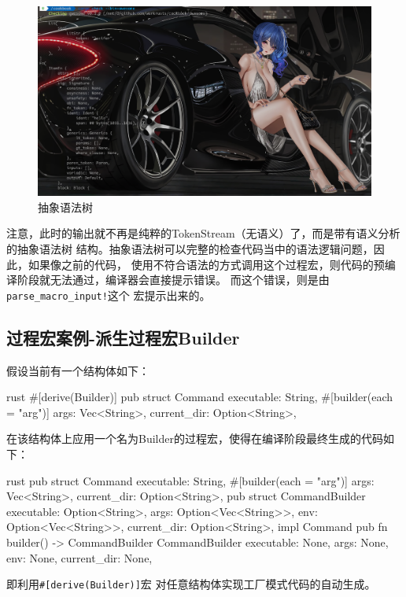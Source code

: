 \begin{figure}[H]
  \centering
  \includegraphics[width=\linewidth]{rust_ast.png}
  \caption{抽象语法树}
  \label{fig:rust_ast}
\end{figure}
注意，此时的输出就不再是纯粹的TokenStream（无语义）了，而是带有语义分析的抽象语法树
结构。抽象语法树可以完整的检查代码当中的语法逻辑问题，因此，如果像之前的代码，
使用不符合语法的方式调用这个过程宏，则代码的预编译阶段就无法通过，编译器会直接提示错误。
而这个错误，则是由\texttt{parse_macro_input!}这个
宏提示出来的。

\subsection{过程宏案例-派生过程宏Builder}
假设当前有一个结构体如下：
\begin{code-block}{rust}
#[derive(Builder)]
pub struct Command {
    executable: String,
    #[builder(each = "arg")]
    args: Vec<String>,
    current_dir: Option<String>,
}
\end{code-block}
在该结构体上应用一个名为Builder的过程宏，使得在编译阶段最终生成的代码如下：
\begin{code-block}{rust}
pub struct Command {
    executable: String,
    #[builder(each = "arg")]
    args: Vec<String>,
    current_dir: Option<String>,
}
pub struct CommandBuilder {
    executable: Option<String>,
    args: Option<Vec<String>>,
    env: Option<Vec<String>>,
    current_dir: Option<String>,
}
impl Command {
    pub fn builder() -> CommandBuilder {
        CommandBuilder {
            executable: None,
            args: None,
            env: None,
            current_dir: None,
        }
    }
}
\end{code-block}
即利用\texttt{#[derive(Builder)]}宏
对任意结构体实现工厂模式代码的自动生成。

